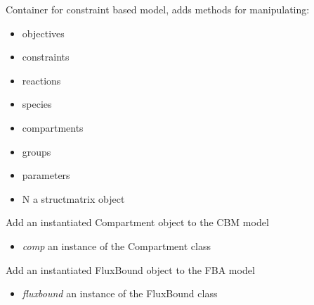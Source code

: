 \documentclass[a4paper,11pt,english]{sphinxmanual}
\begin{document}
\begin{fulllineitems}
\label{modules_doc:cbmpy.CBModel.Model}
Container for constraint based model, adds methods for manipulating:
\begin{itemize}
\item {} 
objectives

\item {} 
constraints

\item {} 
reactions

\item {} 
species

\item {} 
compartments

\item {} 
groups

\item {} 
parameters

\item {} 
N a structmatrix object

\end{itemize}

\begin{fulllineitems}
\label{modules_doc:cbmpy.CBModel.Model.addCompartment}
Add an instantiated Compartment object to the CBM model
\begin{itemize}
\item {} 
\emph{comp} an instance of the Compartment class

\end{itemize}

\end{fulllineitems}


\begin{fulllineitems}
\label{modules_doc:cbmpy.CBModel.Model.addFluxBound}
Add an instantiated FluxBound object to the FBA model
\begin{itemize}
\item {} 
\emph{fluxbound} an instance of the FluxBound class

\end{itemize}


\end{fulllineitems}
\end{fulllineitems}
\end{document}
